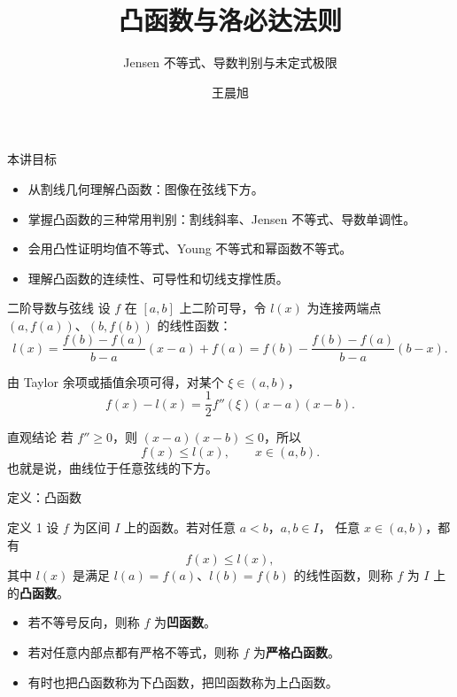 \documentclass[aspectratio=169,11pt]{ctexbeamer}
\title{凸函数与洛必达法则}
\subtitle{Jensen 不等式、导数判别与未定式极限}
\author{王晨旭}
\date{}
\begin{document}
\begin{frame}
  \titlepage
\end{frame}

\begin{frame}{本讲目标}
\begin{itemize}
  \item 从割线几何理解凸函数：图像在弦线下方。
  \item 掌握凸函数的三种常用判别：割线斜率、Jensen 不等式、导数单调性。
  \item 会用凸性证明均值不等式、Young 不等式和幂函数不等式。
  \item 理解凸函数的连续性、可导性和切线支撑性质。
\end{itemize}
\end{frame}

\begin{frame}{二阶导数与弦线}
\small
设 $f$ 在 $[a,b]$ 上二阶可导，令 $l(x)$ 为连接两端点
$(a,f(a))$、$(b,f(b))$ 的线性函数：
\[
  l(x)=\frac{f(b)-f(a)}{b-a}(x-a)+f(a)
      =f(b)-\frac{f(b)-f(a)}{b-a}(b-x).
\]

由 Taylor 余项或插值余项可得，对某个 $\xi\in(a,b)$，
\[
  f(x)-l(x)=\frac12 f''(\xi)(x-a)(x-b).
\]

\begin{block}{直观结论}
若 $f''\ge 0$，则 $(x-a)(x-b)\le 0$，所以
\[
  f(x)\le l(x),\qquad x\in(a,b).
\]
也就是说，曲线位于任意弦线的下方。
\end{block}
\end{frame}

\begin{frame}{定义：凸函数}
\small
\begin{block}{定义 1}
设 $f$ 为区间 $I$ 上的函数。若对任意 $a<b$，$a,b\in I$，
任意 $x\in(a,b)$，都有
\[
  f(x)\le l(x),
\]
其中 $l(x)$ 是满足 $l(a)=f(a)$、$l(b)=f(b)$ 的线性函数，则称
$f$ 为 $I$ 上的\textbf{凸函数}。
\end{block}

\begin{itemize}
  \item 若不等号反向，则称 $f$ 为\textbf{凹函数}。
  \item 若对任意内部点都有严格不等式，则称 $f$ 为\textbf{严格凸函数}。
  \item 有时也把凸函数称为下凸函数，把凹函数称为上凸函数。
\end{itemize}
\end{frame}
\end{document}
